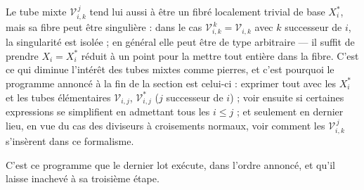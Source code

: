 \documentclass[11pt,a4paper]{article}
\begin{document}
Le tube mixte $\mathcal{V}^{\,j}_{i,k}$ tend lui aussi à être un fibré localement
trivial de base $X_{i}^{*}$, mais sa fibre peut être singulière : dans le cas
$\mathcal{V}^{\,k}_{i,k} = \mathcal{V}_{i,k}$ avec $k$ successeur de $i$, la
singularité est isolée ; en général elle peut être de type arbitraire — il suffit
de prendre $X_{i} = X_{i}^{*}$ réduit à un point pour la mettre tout entière dans
la fibre. C'est ce qui diminue l'intérêt des tubes mixtes comme pierres, et
c'est pourquoi le programme annoncé à la fin de la section est celui-ci :
exprimer tout avec les $X_{i}^{*}$ et les tubes élémentaires
$\mathcal{V}_{i,j}$, $\mathcal{V}^{*}_{i,j}$ ($j$ successeur de $i$) ; voir
ensuite si certaines expressions se simplifient en admettant tous les
$i \leq j$ ; et seulement en dernier lieu, en vue du cas des diviseurs à
croisements normaux, voir comment les $\mathcal{V}^{\,j}_{i,k}$ s'insèrent dans
ce formalisme.

C'est ce programme que le dernier lot exécute, dans l'ordre annoncé, et qu'il
laisse inachevé à sa troisième étape.
\end{document}
